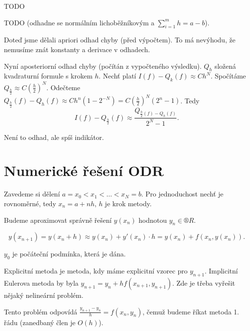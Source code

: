 \documentclass[12pt]{article}					%
\begin{document}
\begin{veta}
	TODO

	\begin{dukazin}
		TODO (odhadne se normálním lichoběžníkovým a $\sum_{i=1}^m h = a - b$).
	\end{dukazin}
\end{veta}

\begin{definice}
	Doteď jsme dělali apriori odhad chyby (před výpočtem). To má nevýhodu, že nemusíme znát konstanty a derivace v odhadech.

	Nyní aposteriorní odhad chyby (počítán z vypočteného výsledku). $Q_h$ složená kvadraturní formule s krokem $h$. Nechť platí $I(f) - Q_k(f) \approx C h^N$. Spočítáme $Q_{\frac{h}{2}} \approx C(\frac{h}{2})^N$. Odečteme $Q_{\frac{h}{2}}(f) - Q_h(f) \approx C h^n(1 - 2^{-N}) = C(\frac{h}{2})^N (2^n - 1)$. Tedy
	$$ I(f) - Q_{\frac{h}{2}}(f) \approx \frac{Q_{\frac{h}{2}(f) - Q_h(f)}}{2^N - 1}. $$

	Není to odhad, ale spíš indikátor.
\end{definice}

\section{Numerické řešení ODR}
\begin{poznamka}[Diskretizace]
	Zavedeme si dělení $a = x_0 < x_1 < … < x_N = b$. Pro jednoduchost nechť je rovnoměrné, tedy $x_n = a + nh$, $h$ je krok metody.

	Budeme aproximovat správně řešení $y(x_n)$ hodnotou $y_n \in ®R$.
\end{poznamka}

\begin{definice}
	$$ y(x_{n+1}) = y(x_n + h) \approx y(x_n) + y'(x_n)·h = y(x_n) + f(x_n, y(x_n)). $$

	$y_0$ je počáteční podmínka, která je dána.
\end{definice}

\begin{definice}
	Explicitní metoda je metoda, kdy máme explicitní vzorec pro $y_{n+1}$. Implicitní Eulerova metoda by byla $y_{n+1} = y_n + hf(x_{n+1}, y_{n+1})$. Zde je třeba vyřešit nějaký nelineární problém.

	Tento problém odpovídá $\frac{y_{n + 1} - y_n}{h} = f(x_n, y_n)$, čemuž budeme říkat metoda 1. řádu (zanedbaný člen je $O(h)$).
\end{definice}
\end{document}
